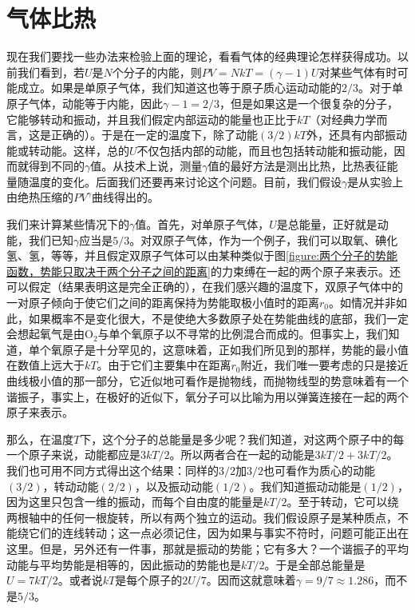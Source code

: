 \section{气体比热}

现在我们要找一些办法来检验上面的理论，看看气体的经典理论怎样获得成功。以前我们看到，若$U$是$N$个分子的内能，则$PV=NkT=(\gamma-1)U$对某些气体有时可能成立。如果是单原子气体，我们知道这也等于原子质心运动动能的$2/3$。对于单原子气体，动能等于内能，因此$\gamma-1=2/3$，但是如果这是一个很复杂的分子，它能够转动和振动，并且我们假定内部运动的能量也正比于$kT$（对经典力学而言，这是正确的）。于是在一定的温度下，除了动能$(3/2)kT$外，还具有内部振动能或转动能。这样，总的$U$不仅包括内部的动能，而且也包括转动能和振动能，因而就得到不同的$\gamma$值。从技术上说，测量$\gamma$值的最好方法是测出比热，比热表征能量随温度的变化。后面我们还要再来讨论这个问题。目前，我们假设$\gamma$是从实验上由绝热压缩的$PV^\gamma$曲线得出的。

我们来计算某些情况下的$\gamma$值。首先，对单原子气体，$U$是总能量，正好就是动能，我们已知$\gamma$应当是$5/3$。对双原子气体，作为一个例子，我们可以取氧、碘化氢、氢，等等，并且假定双原子气体可以由某种类似于图\ref{figure:两个分子的势能函数，势能只取决于两个分子之间的距离}的力束缚在一起的两个原子来表示。还可以假定（结果表明这是完全正确的），在我们感兴趣的温度下，双原子气体中的一对原子倾向于使它们之间的距离保持为势能取极小值时的距离$r_0$。如情况并非如此，如果概率不是变化很大，不是使绝大多数原子处在势能曲线的底部，我们一定会想起氧气是由O$_2$与单个氧原子以不寻常的比例混合而成的。但事实上，我们知道，单个氧原子是十分罕见的，这意味着，正如我们所见到的那样，势能的最小值在数值上远大于$kT$。由于它们主要集中在距离$r_0$附近，我们唯一要考虑的只是接近曲线极小值的那一部分，它近似地可看作是抛物线，而抛物线型的势意味着有一个谐振子，事实上，在极好的近似下，氧分子可以比喻为用以弹簧连接在一起的两个原子来表示。

那么，在温度$T$下，这个分子的总能量是多少呢？我们知道，对这两个原子中的每一个原子来说，动能都应是$3kT/2$。所以两者合在一起的动能是$3kT/2+3kT/2$。我们也可用不同方式得出这个结果：同样的$3/2$加$3/2$也可看作为质心的动能$(3/2)$，转动动能$(2/2)$，以及振动动能$(1/2)$。我们知道振动动能是$(1/2)$，因为这里只包含一维的振动，而每个自由度的能量是$kT/2$。至于转动，它可以绕两根轴中的任何一根旋转，所以有两个独立的运动。我们假设原子是某种质点，不能绕它们的连线转动；这一点必须记住，因为如果与事实不符时，问题可能正出在这里。但是，另外还有一件事，那就是振动的势能；它有多大？一个谐振子的平均动能与平均势能是相等的，因此振动的势能也是$kT/2$。于是全部总能量是$U=7kT/2$。或者说$kT$是每个原子的$2U/7$。因而这就意味着$\gamma=9/7\approx 1.286$，而不是$5/3$。


